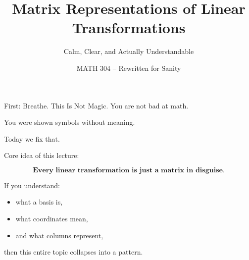 \documentclass[aspectratio=169]{beamer}
\title{Matrix Representations of Linear Transformations}
\subtitle{Calm, Clear, and Actually Understandable}
\author{MATH 304 -- Rewritten for Sanity}
\date{}
\begin{document}
\begin{frame}
\titlepage
\end{frame}

\begin{frame}{First: Breathe. This Is Not Magic.}
You are not bad at math.  

You were shown symbols without meaning.

Today we fix that.

\bigskip

Core idea of this lecture:

\[
\textbf{Every linear transformation is just a matrix in disguise.}
\]

\bigskip

If you understand:
\begin{itemize}
\item what a basis is,
\item what coordinates mean,
\item and what columns represent,
\end{itemize}

then this entire topic collapses into a pattern.
\end{frame}
\end{document}
